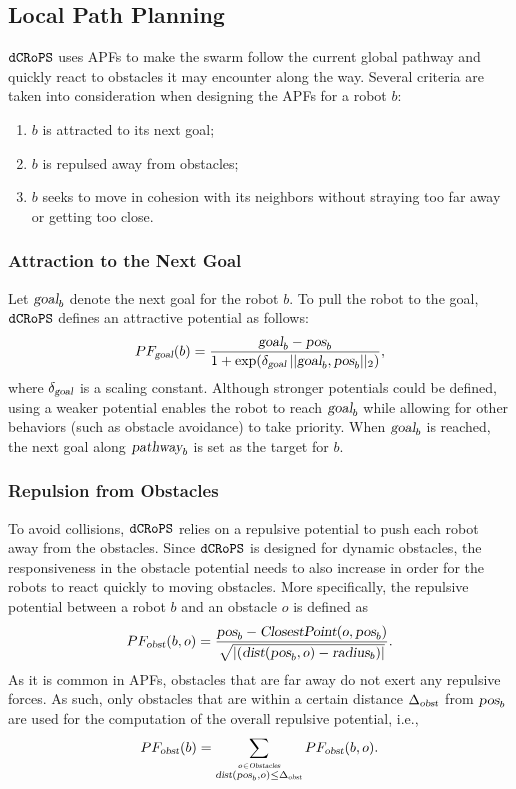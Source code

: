 \documentclass[letterpaper, 10pt, conference]{ieeeconf}
\newcommand{\Acronym}[1]{\ensuremath{{\small{\texttt{#1}}}}}
\newcommand{\Var}[1]{\ensuremath{{\small{\textsl{#1}}}}}
\newcommand{\Name}{\Acronym{dCRoPS}}
\begin{document}
\subsection{Local Path Planning}
$\Name$ uses APFs to make the swarm follow the current global
pathway and quickly react to obstacles it may encounter along the way.
Several criteria are taken into consideration when designing
the APFs for a robot $b$:
\begin{enumerate}
\item $b$ is attracted to its next goal; 
\item $b$ is repulsed away from obstacles; 
\item $b$ seeks to move in cohesion with its neighbors without
  straying too far away or getting too close.
\end{enumerate}

\subsubsection{Attraction to the Next Goal}

Let $\Var{goal}_b$ denote the next goal for the robot $b$. To pull the
robot to the goal, $\Name$ defines an attractive potential as follows:
$$
PF_\Var{goal}(b) = \frac{\Var{goal}_b - \Var{pos}_b}{1 +
  \exp(\delta_\Var{goal}\, ||\Var{goal}_b, \Var{pos}_b||_2)},
$$ where $\delta_\Var{goal}$ is a scaling constant. Although stronger
potentials could be defined, using a weaker potential
enables the robot to reach $\Var{goal}_b$ while allowing for other behaviors
(such as obstacle avoidance) to take priority. When $\Var{goal}_b$ is
reached, the next goal along $\Var{pathway}_b$ is set as the target 
for $b$.


\subsubsection{Repulsion from Obstacles}
\label{sec:PFobst} 
To avoid collisions, $\Name$ relies on a repulsive potential to push
each robot away from the obstacles. Since $\Name$ is  
designed for dynamic obstacles, the responsiveness in the
obstacle potential needs to also increase in order for the
robots to react quickly to moving obstacles. More specifically, 
the repulsive potential between a robot $b$ and an obstacle $o$ is
defined as
$$ 
PF_\Var{obst}(b, o) = \frac{\Var{pos}_b
- \Var{ClosestPoint}(o, \Var{pos}_b)}{\sqrt{\vert(\Var{dist}(\Var{pos}_b, o) - \Var{radius}_b)\vert}}.
$$
As it is common in APFs, obstacles that are far away do not exert any
repulsive forces. As such, only obstacles that are within a certain
distance $\Delta_\Var{obst}$ from $\Var{pos}_b$ are used for the
computation of the overall repulsive potential, i.e.,
$$
PF_\Var{obst}(b) = \sum_{\stackrel{o \in
    \Var{Obstacles}}{\Var{dist}(\Var{pos}_b, o) \leq \Delta_\Var{obst}}}  PF_\Var{obst}(b, o).
$$
\end{document}
